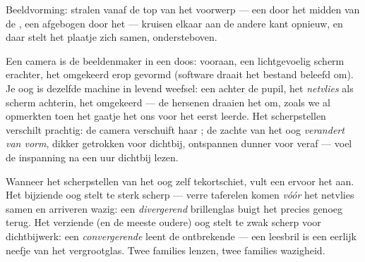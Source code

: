 \begin{omfigure}

{\small Beeldvorming: stralen vanaf de top van het voorwerp --- een
door het midden van de , een afgebogen door het 
--- kruisen elkaar aan de andere kant opnieuw, en daar stelt het plaatje
zich samen, ondersteboven.}
\end{omfigure}

\begin{example}\label{ex:g8:lenses-images:cameraeye}
Een camera is de beeldenmaker in een doos:
 vooraan, een lichtgevoelig scherm erachter,
het  omgekeerd erop gevormd (software draait het bestand
beleefd om). Je oog is dezelfde machine in levend weefsel: een
 achter de pupil, het \emph{netvlies} als
scherm achterin, het  omgekeerd --- de hersenen draaien het
om, zoals we al opmerkten toen het gaatje het ons voor het eerst
leerde. Het scherpstellen verschilt prachtig: de camera verschuift haar
; de zachte  van het oog
\emph{verandert van vorm}, dikker getrokken voor dichtbij, ontspannen
dunner voor veraf --- voel de inspanning na een uur dichtbij lezen.
\end{example}

\begin{example}[Brillen]\label{ex:g8:lenses-images:spectacles}
Wanneer het scherpstellen van het oog zelf tekortschiet, vult een
 ervoor het aan. Het bijziende oog stelt te sterk scherp
--- verre taferelen komen \emph{vóór} het netvlies samen en arriveren
wazig: een \emph{divergerend} brillenglas buigt het
 precies genoeg terug. Het verziende (en de meeste oudere)
oog stelt te zwak scherp voor dichtbijwerk: een \emph{convergerende}
 leent de ontbrekende  --- een leesbril is een
eerlijk neefje van het vergrootglas. Twee families
lenzen, twee families wazigheid.
\end{example}

